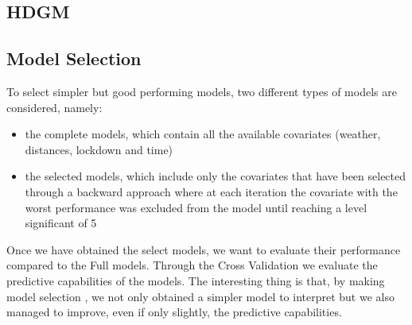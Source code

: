 \subsection{HDGM}
\subsection{Model Selection}
To select simpler but good performing models, two different types of models are considered, namely:
\begin{itemize}
	\item the complete models, which contain all the available covariates (weather, distances, lockdown and time) 
	\item the selected models, which include only the covariates that have been selected through a backward approach where at each iteration the covariate with the worst performance was excluded from the model until reaching a level significant of 5%
\end{itemize}
Once we have obtained the select models, we want to evaluate their performance compared to the Full models. Through the Cross Validation we evaluate the predictive capabilities of the models. The interesting thing is that, by making model selection , we not only obtained a simpler model to interpret but we also managed to improve, even if only slightly, the predictive capabilities. 

